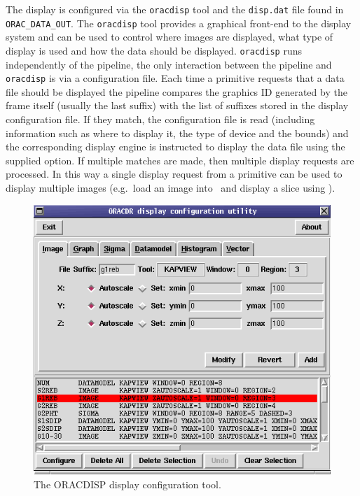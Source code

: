 \documentclass[twoside,11pt,nolof]{starlink}
\providecommand{\Kappa}{\xref{{\sc{Kappa}}}{sun95}{}}
\providecommand{\gaia}{\xref{{\sc{Gaia}}}{sun214}{}}
\begin{document}
The display is configured via the \texttt{oracdisp} tool and the
\texttt{disp.dat} file found in \texttt{ORAC\_DATA\_OUT}. The \texttt{oracdisp}
tool provides a graphical front-end to the display system and
can be used to control where images are displayed, what type of display
is used and how the data should be displayed. \texttt{oracdisp}
runs independently of the pipeline, the only interaction between
the pipeline and \texttt{oracdisp} is via a configuration file.
Each time a primitive requests that a data file should be displayed
the pipeline compares the graphics ID generated by the frame itself (usually
the last suffix) with the list of suffixes stored in the display configuration
file. If they match, the configuration file is read (including information
such as where to display it, the type of device and the bounds) and the
corresponding display engine is instructed to display the data file
using the supplied option. If multiple matches are made, then multiple
display requests are processed. In this way a single display request
from a primitive can be used to display multiple images (e.g.\ load an image
into \gaia\ and display a slice using \Kappa).


\begin{figure}
\begin{center}
\includegraphics[width=\textwidth]{sun231_disp}
\caption{The ORACDISP display configuration tool.}
\label{fig:oracdisp}
\end{center}
\end{figure}
\end{document}
